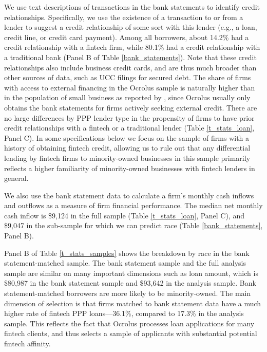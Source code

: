 \documentclass[11pt]{article}
\begin{document}
We use text descriptions of transactions in the bank statements to identify credit relationships. Specifically, we use the existence of a transaction to or from a lender to suggest a credit relationship of some sort with this lender (e.g., a loan, credit line, or credit card payment). Among all borrowers, about 14.2\% had a credit relationship with a fintech firm, while 80.1\% had a credit relationship with a traditional bank (Panel B of Table \ref{bank_statements}). Note that these credit relationships also include business credit cards, and are thus much broader than other sources of data, such as UCC filings for secured debt. The share of firms with access to external financing in the Ocrolus sample is naturally higher than in the population of small business as reported by \cite{alekseev2020}, since Ocrolus usually only obtains the bank statements for firms actively seeking external credit. There are no large differences by PPP lender type in the propensity of firms to have prior credit relationships with a fintech or a traditional lender (Table \ref{t_stats_loan}, Panel C). In some specifications below we focus on the sample of firms with a history of obtaining fintech credit, allowing us to rule out that any differential lending by fintech firms to minority-owned businesses in this sample primarily reflects a higher familiarity of minority-owned businesses with fintech lenders in general.

We also use the bank statement data to calculate a firm's monthly cash inflows and outflows as a measure of firm financial performance. The median net monthly cash inflow is \$9,124 in the full sample (Table \ref{t_stats_loan}, Panel C), and \$9,047 in the sub-sample for which we can predict race  (Table \ref{bank_statements}, Panel B).

Panel B of Table \ref{t_stats_samples} shows the breakdown by race in the bank statement-matched sample. The bank statement sample and the full analysis sample are similar on many important dimensions such as loan amount, which is \$80,987 in the bank statement sample and \$93,642 in the analysis sample. Bank statement-matched borrowers are more likely to be minority-owned. The main dimension of selection is that firms matched to bank statement data have a much higher rate of fintech PPP loans---36.1\%, compared to 17.3\% in the analysis sample. This reflects the fact that Ocrolus processes loan applications for many fintech clients, and thus selects a sample of applicants with substantial potential fintech affinity.
\end{document}
